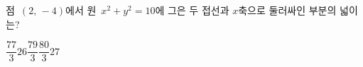 점~$(2,\,-4)$에서 원~$x^2+y^2=10$에 그은 두 접선과 $x$축으로 둘러싸인 부분의 넓이는?
\begin{choices32}{$\dfrac{77}{3}$}{$26$}{$\dfrac{79}{3}$}{$\dfrac{80}{3}$}{$27$}\end{choices32}
